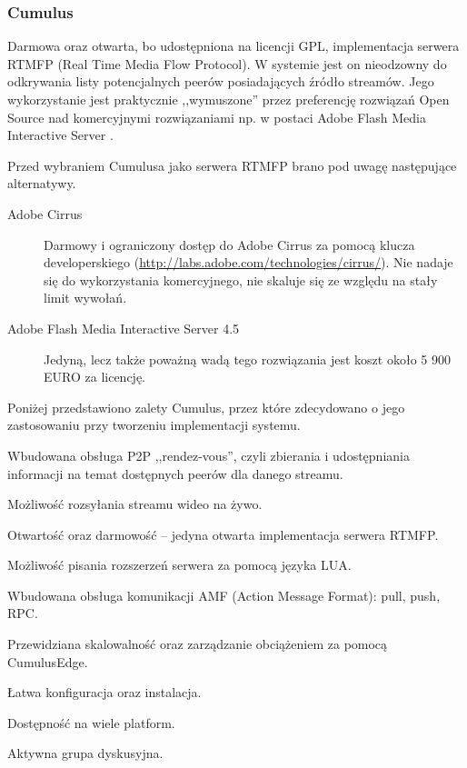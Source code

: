 \newpage
\subsubsection{Cumulus}
Darmowa oraz otwarta, bo udostępniona na licencji GPL, implementacja serwera RTMFP (Real Time Media Flow Protocol). W systemie jest on nieodzowny do odkrywania listy potencjalnych peerów posiadających źródło streamów. Jego wykorzystanie jest praktycznie ,,wymuszone'' przez preferencję rozwiązań Open Source nad komercyjnymi rozwiązaniami np. w postaci Adobe Flash Media Interactive Server \cite{Cumulus}.

Przed wybraniem Cumulusa jako serwera RTMFP brano pod uwagę następujące alternatywy.
\begin{description}
    \item[Adobe Cirrus] Darmowy i ograniczony dostęp do Adobe Cirrus za pomocą klucza developerskiego (\url{http://labs.adobe.com/technologies/cirrus/}). Nie nadaje się do wykorzystania komercyjnego, nie skaluje się ze względu na stały limit wywołań.
    \item[Adobe Flash Media Interactive Server 4.5] Jedyną, lecz także poważną wadą tego rozwiązania jest koszt około 5 900 EURO za licencję.
\end{description}

Poniżej przedstawiono zalety Cumulus, przez które zdecydowano o jego zastosowaniu przy tworzeniu implementacji systemu.
\begin{packed_item}
    \item{Wbudowana obsługa P2P ,,rendez-vous'', czyli zbierania i udostępniania informacji na temat dostępnych peerów dla danego streamu.}
    \item{Możliwość rozsyłania streamu wideo na żywo.}
    \item{Otwartość oraz darmowość -- jedyna otwarta implementacja serwera RTMFP.}
    \item{Możliwość pisania rozszerzeń serwera za pomocą języka LUA.}
    \item{Wbudowana obsługa komunikacji AMF (Action Message Format): pull, push, RPC.}
    \item{Przewidziana skalowalność oraz zarządzanie obciążeniem za pomocą CumulusEdge.}
    \item{Łatwa konfiguracja oraz instalacja.}
    \item{Dostępność na wiele platform.}
    \item{Aktywna grupa dyskusyjna.}
\end{packed_item}

